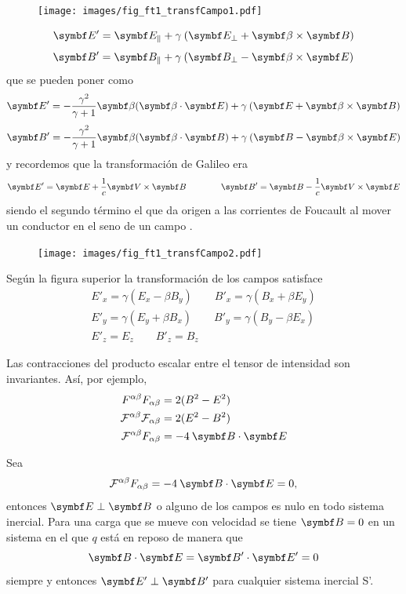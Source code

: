 \documentclass[10pt,oneside]{CBFT_book}
\begin{document}
\begin{figure}[htb]
	\begin{center}
	\texttt{[image: images/fig\_ft1\_transfCampo1.pdf]}	 
	\end{center}
	\caption{}
\end{figure} 

\[
	\vb{E}' = \vb{E}_\parallel + \gamma \: ( \vb{E}_\perp  + \pv{\beta}{B} )
\]
\[
	\vb{B}' = \vb{B}_\parallel + \gamma \: ( \vb{B}_\perp  - \pv{\beta}{E} )
\]
que se pueden poner como 
\[
	\vb{E}' = - \frac{ \gamma^2 }{ \gamma + 1 }\vb{\beta} (\pe{\beta}{E}) +
		\gamma \: ( \vb{E}  + \pv{\beta}{B} )
\]
\[
	\vb{B}' = - \frac{ \gamma^2 }{ \gamma + 1 }\vb{\beta} (\pe{\beta}{B}) + 
		\gamma \: ( \vb{B}  - \pv{\beta}{E} )
\]
y recordemos que la transformación de Galileo era
\[
	\vb{E}' = \vb{E} + \frac{1}{c} \pv{V}{B} \qquad \qquad 
	\vb{B}' = \vb{B} - \frac{1}{c} \pv{V}{E}
\]
siendo el segundo término el que da origen a las corrientes de Foucault al mover un conductor en el seno
de un campo .

\begin{figure}[htb]
	\begin{center}
	\texttt{[image: images/fig\_ft1\_transfCampo2.pdf]}	 
	\end{center}
	\caption{}
\end{figure} 

Según la figura superior la transformación de los campos satisface 
\begin{align*}
	E'_x = \gamma ( E_x - \beta B_y ) \qquad B'_x = \gamma ( B_x + \beta E_y ) \\
	E'_y = \gamma ( E_y + \beta B_x ) \qquad B'_y = \gamma ( B_y - \beta E_x ) \\
	E'_z = E_z \qquad B'_z = B_z 
\end{align*}

Las contracciones del producto escalar entre el tensor de intensidad son invariantes. Así, por ejemplo,
\begin{align*}
	F^{\alpha\beta}F_{\alpha\beta} &= 2( B^2 - E^2 ) \\
	\mathcal{F}^{\alpha\beta}\mathcal{F}_{\alpha\beta} &= 2( E^2 - B^2 ) \\
	\mathcal{F}^{\alpha\beta}F_{\alpha\beta} &= -4 \: \pe{B}{E}
\end{align*}

Sea 
\[
	\mathcal{F}^{\alpha\beta}F_{\alpha\beta} = -4 \: \pe{B}{E} = 0,
\]
entonces $\vb{E} \perp \vb{B}$ o alguno de los campos es nulo en todo sistema inercial. Para una carga 
que se mueve con velocidad  se tiene $\vb{B}=0$ en un sistema en el que $q$ está en reposo de manera
que 
\[
	\pe{B}{E} = \pe{B'}{E'} = 0
\]
siempre y entonces $\vb{E'} \perp \vb{B'}$ para cualquier sistema inercial S'.
\end{document}
